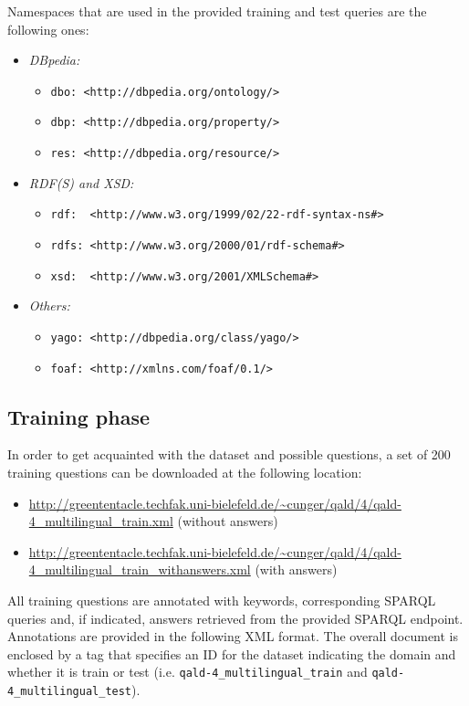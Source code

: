 Namespaces that are used in the provided training and test queries are the following ones:
\begin{itemize}
\item \emph{DBpedia:}
  \begin{itemize}
  \item[] \texttt{dbo: <http://dbpedia.org/ontology/>} 
  \item[] \texttt{dbp: <http://dbpedia.org/property/>} 
  \item[] \texttt{res: <http://dbpedia.org/resource/>} 
  \end{itemize}
\item \emph{RDF(S) and XSD:}
  \begin{itemize}
  \item[] \texttt{rdf:\ \ <http://www.w3.org/1999/02/22-rdf-syntax-ns\#>} 
  \item[] \texttt{rdfs: <http://www.w3.org/2000/01/rdf-schema\#>} 
  \item[] \texttt{xsd:\ \ <http://www.w3.org/2001/XMLSchema\#>}
  \end{itemize}
\item \emph{Others:}
  \begin{itemize}
  \item[] \texttt{yago: <http://dbpedia.org/class/yago/>} 
  \item[] \texttt{foaf: <http://xmlns.com/foaf/0.1/> } 
  \end{itemize}
\end{itemize}


\subsection{Training phase}
\label{sec:training}

In order to get acquainted with the dataset and possible questions, a set of 200 training questions can be downloaded at the following location: 
\begin{itemize} 
\item \url{http://greententacle.techfak.uni-bielefeld.de/~cunger/qald/4/qald-4_multilingual_train.xml} (without answers)
\item \url{http://greententacle.techfak.uni-bielefeld.de/~cunger/qald/4/qald-4_multilingual_train_withanswers.xml} (with answers)
\end{itemize} 

All training questions are annotated with keywords, corresponding SPARQL queries and, if indicated, answers retrieved from the provided SPARQL endpoint. 
Annotations are provided in the following XML format.
The overall document is enclosed by a tag that specifies an ID for the dataset indicating the domain 
and whether it is train or test (i.e. {\tt qald-4\_multilingual\_train} and {\tt qald-4\_multilingual\_test}).

